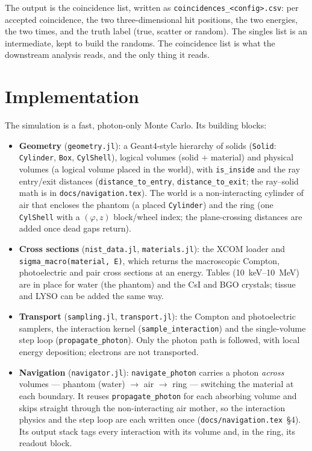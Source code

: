 \documentclass[11pt]{article}
\begin{document}
The output is the coincidence list, written as \texttt{coincidences\_<config>.csv}: per
accepted coincidence, the two three-dimensional hit positions, the two energies, the two
times, and the truth label (true, scatter or random). The singles list is an
intermediate, kept to build the randoms. The coincidence list is what the downstream
analysis reads, and the only thing it reads.

\section{Implementation}
\label{sec:impl}

The simulation is a fast, photon-only Monte Carlo. Its building blocks:
\begin{itemize}[nosep]
\item \textbf{Geometry} (\texttt{geometry.jl}): a Geant4-style hierarchy of solids
(\texttt{Solid}: \texttt{Cylinder}, \texttt{Box}, \texttt{CylShell}), logical volumes
(solid $+$ material) and physical volumes (a logical volume placed in the world), with
\texttt{is\_inside} and the ray entry/exit distances (\texttt{distance\_to\_entry},
\texttt{distance\_to\_exit}; the ray--solid math is in \texttt{docs/navigation.tex}). The
world is a non-interacting cylinder of air that encloses the phantom (a placed
\texttt{Cylinder}) and the ring (one \texttt{CylShell} with a $(\varphi, z)$ block/wheel
index; the plane-crossing distances are added once dead gaps return).
\item \textbf{Cross sections} (\texttt{nist\_data.jl}, \texttt{materials.jl}): the XCOM
loader and \texttt{sigma\_macro(material, E)}, which returns the macroscopic Compton,
photoelectric and pair cross sections at an energy. Tables (\SI{10}{keV}--\SI{10}{MeV}) are
in place for water (the phantom) and the CsI and BGO crystals; tissue and LYSO can be added
the same way.
\item \textbf{Transport} (\texttt{sampling.jl}, \texttt{transport.jl}): the Compton and
photoelectric samplers, the interaction kernel (\texttt{sample\_interaction}) and the
single-volume step loop (\texttt{propagate\_photon}). Only the photon path is followed,
with local energy deposition; electrons are not transported.
\item \textbf{Navigation} (\texttt{navigator.jl}): \texttt{navigate\_photon} carries a
photon \emph{across} volumes --- phantom (water) $\to$ air $\to$ ring --- switching the
material at each boundary. It reuses \texttt{propagate\_photon} for each absorbing volume
and skips straight through the non-interacting air mother, so the interaction physics and
the step loop are each written once (\texttt{docs/navigation.tex}~\S4). Its output stack
tags every interaction with its volume and, in the ring, its readout block.
\end{itemize}
\end{document}
